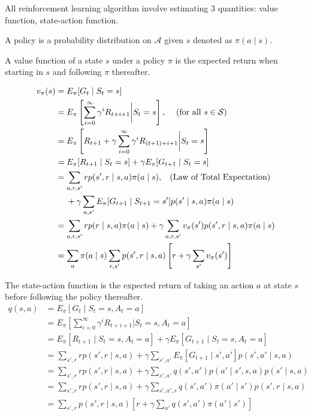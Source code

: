 \documentclass[twocolumn, 10pt]{article}
\newcommand{\actionset}{ \mathcal{A}}
\newcommand{\stateset}{\mathcal{S}}
\newcommand{\Mid}{ \bigg|}
\begin{document}
All reinforcement learning algorithm involve estimating 3 quantities: value function, state-action function.

A policy is a probability distribution on $\actionset$ given $s$ denoted as  $\pi (a \mid s)$.

A value function of a state $s$ under a policy $\pi$ is the expected return when starting in  $s$ and following $\pi$ thereafter.

$$ 
\begin{aligned}
v_{\pi}(s) &= E_{\pi} [G_t \mid S_t = s]  \\
                 &=  E_{\pi} \left[ \sum^{\infty}_{i=0}  \gamma^i R_{t + i + 1} \Mid S_t = s \right],  \hspace{2ex} \mbox{ (for all } s \in \stateset)  \\
                 &=  E_{\pi} \left[ R_{t+1} + \gamma \sum^{\infty}_{i=0} \gamma^i R_{(t+1) + i + 1} \Mid S_t = s \right] \\
                 &=  E_{\pi} [ R_{t+1} \mid S_t = s]  + \gamma  E_{\pi} [ G_{t+1} \mid S_t = s ] \\
                 &=  \sum_{a, r, s'} r p(s',  r \mid s , a) \pi(a \mid s) , \hspace{2ex} \mbox{(Law of Total Expectation)} \\ 
                 &\hspace{3ex} +  \gamma  \sum_{a, s'} E_{\pi}[G_{t + 1} \mid S_{t+1} = s'] p(s' \mid s, a)  \pi (a \mid s)  \\
                 &=  \sum_{a, r, s'} r p( r \mid s , a) \pi(a \mid s)  +  \gamma  \sum_{a, r, s'} v_{\pi}(s')  p(s', r \mid s, a)  \pi (a \mid s)  \\
                 &= \sum_{a} \pi(a \mid s)  \sum_{r, s'}   p(s', r \mid s, a)   \left[ r  + \gamma \sum_{s'}  v_{\pi}(s')  \right]
\end{aligned}
$$

The state-action function is the expected return  of taking an action $a$ at state $s$ before following the policy thereafter.
$$
\begin{aligned}
 q(s, a) &= E_{\pi} [G_t \mid S_t = s, A_t = a]  \\
             &= E_{\pi} \left[ \sum^{\infty}_{i=0}  \gamma^i R_{t + i + 1}  \Mid S_t = s , A_t = a\right]  \\
             &= E_{\pi} [R_{t+1} \mid S_t = s, A_t =  a] + \gamma E_{\pi} [ G_{t+1} \mid S_t = s, A_t =  a] \\
             &=  \sum_{s', r} r p(s', r  \mid s, a) + \gamma \sum_{s', a'} E_{\pi} [G_{t+1} \mid s', a'] p(s', a' \mid s, a) \\
             &=  \sum_{s', r} r p(s', r  \mid s, a) + \gamma \sum_{s', a'} q(s', a') p( a' \mid s',  s, a) p(s' \mid  s, a) \\
             &=  \sum_{s', r} r p(s', r  \mid s, a) + \gamma \sum_{s', a', r} q(s', a') \pi(a' \mid s')  p(s', r \mid  s, a) \\
             &=  \sum_{s', r}  p(s', r  \mid s, a) \left [ r + \gamma \sum_{a'} q(s', a') \pi(a' \mid s')  \right] 
 \end{aligned}
$$
\end{document}
